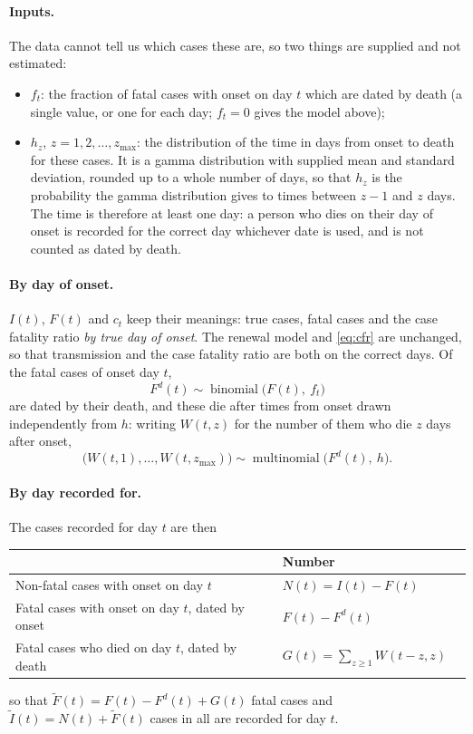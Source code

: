 \documentclass[11pt,a4paper]{article}
\newcommand{\bin}{\operatorname{binomial}}
\begin{document}
\paragraph{Inputs.} The data cannot tell us which cases these are, so two
things are supplied and not estimated:
\begin{itemize}
\item $f_t$: the fraction of fatal cases with onset on day $t$ which are
dated by death (a single value, or one for
each day; $f_t=0$ gives the model above);
\item $h_z$, $z=1,2,\dots,z_{\max}$: the distribution of the time in days
from onset to death for these cases. It is a gamma distribution with
supplied mean and standard deviation, rounded up to a whole number of days,
so that $h_z$ is the probability the gamma distribution gives to times
between $z-1$ and $z$ days. The time is therefore at least one day: a
person who dies on their day of onset is recorded for the correct day
whichever date is used, and is not counted as dated by death.
\end{itemize}

\paragraph{By day of onset.} $I(t)$, $F(t)$ and $c_t$ keep their meanings:
true cases, fatal cases and the case fatality ratio \emph{by true day of
onset}. The renewal model and \eqref{eq:cfr} are unchanged, so that
transmission and the case fatality ratio are both on the correct days. Of
the fatal cases of onset day $t$,
\begin{equation}
F^{d}(t)\sim\bin\bigl(F(t),\ f_t\bigr)
\label{eq:dated}
\end{equation}
are dated by their death, and these die after times from onset drawn
independently from $h$: writing $W(t,z)$ for the number of them who die $z$
days after onset,
\begin{equation}
\bigl(W(t,1),\dots,W(t,z_{\max})\bigr)\sim
\operatorname{multinomial}\bigl(F^{d}(t),\ h\bigr).
\label{eq:lags}
\end{equation}

\paragraph{By day recorded for.} The cases recorded for day $t$ are then
\begin{center}
\begin{tabular}{lll}
\toprule
 & Number & \\
\midrule
Non-fatal cases with onset on day $t$ & $N(t)=I(t)-F(t)$ & \\
Fatal cases with onset on day $t$, dated by onset & $F(t)-F^{d}(t)$ & \\
Fatal cases who died on day $t$, dated by death & $G(t)=\sum_{z\geq 1}W(t-z,z)$ & \\
\bottomrule
\end{tabular}
\end{center}
so that $\tilde{F}(t)=F(t)-F^{d}(t)+G(t)$ fatal cases and
$\tilde{I}(t)=N(t)+\tilde{F}(t)$ cases in all are recorded for day $t$.
\end{document}
